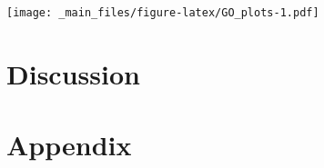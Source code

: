 \documentclass[
]{book}
\begin{document}
\texttt{[image: \_main\_files/figure-latex/GO\_plots-1.pdf]}

\hypertarget{DISCUSSION}{%
\chapter*{Discussion}\label{DISCUSSION}}


\hypertarget{APPENDIX}{%
\chapter*{Appendix}\label{APPENDIX}}


  
\end{document}
